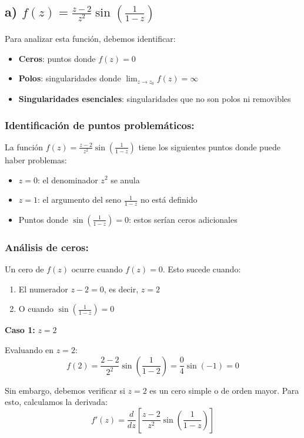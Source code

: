 \documentclass{article}
\begin{document}
\subsection*{a) $f(z) = \frac{z - 2}{z^2} \sin\left(\frac{1}{1 - z}\right)$}

Para analizar esta función, debemos identificar:
\begin{itemize}
\item \textbf{Ceros}: puntos donde $f(z) = 0$
\item \textbf{Polos}: singularidades donde $\lim_{z \to z_0} f(z) = \infty$
\item \textbf{Singularidades esenciales}: singularidades que no son polos ni removibles
\end{itemize}

\subsubsection*{Identificación de puntos problemáticos:}

La función $f(z) = \frac{z - 2}{z^2} \sin\left(\frac{1}{1 - z}\right)$ tiene los siguientes puntos donde puede haber problemas:
\begin{itemize}
\item $z = 0$: el denominador $z^2$ se anula
\item $z = 1$: el argumento del seno $\frac{1}{1 - z}$ no está definido
\item Puntos donde $\sin\left(\frac{1}{1 - z}\right) = 0$: estos serían ceros adicionales
\end{itemize}

\subsubsection*{Análisis de ceros:}

Un cero de $f(z)$ ocurre cuando $f(z) = 0$. Esto sucede cuando:
\begin{enumerate}
\item El numerador $z - 2 = 0$, es decir, $z = 2$
\item O cuando $\sin\left(\frac{1}{1 - z}\right) = 0$
\end{enumerate}

\textbf{Caso 1:} $z = 2$

Evaluando en $z = 2$:
$$f(2) = \frac{2 - 2}{2^2} \sin\left(\frac{1}{1 - 2}\right) = \frac{0}{4} \sin(-1) = 0$$

Sin embargo, debemos verificar si $z = 2$ es un cero simple o de orden mayor. Para esto, calculamos la derivada:
$$f'(z) = \frac{d}{dz}\left[\frac{z - 2}{z^2} \sin\left(\frac{1}{1 - z}\right)\right]$$
\end{document}
